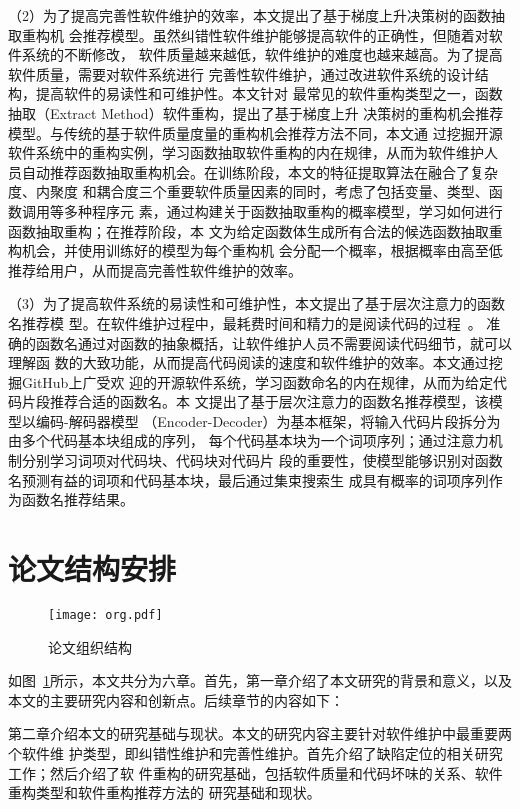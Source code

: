 （2）为了提高完善性软件维护的效率，本文提出了基于梯度上升决策树的函数抽取重构机
会推荐模型。虽然纠错性软件维护能够提高软件的正确性，但随着对软件系统的不断修改，
软件质量越来越低，软件维护的难度也越来越高。为了提高软件质量，需要对软件系统进行
完善性软件维护，通过改进软件系统的设计结构，提高软件的易读性和可维护性。本文针对
最常见的软件重构类型之一，函数抽取（Extract Method）软件重构，提出了基于梯度上升
决策树的重构机会推荐模型。与传统的基于软件质量度量的重构机会推荐方法不同，本文通
过挖掘开源软件系统中的重构实例，学习函数抽取软件重构的内在规律，从而为软件维护人
员自动推荐函数抽取重构机会。在训练阶段，本文的特征提取算法在融合了复杂度、内聚度
和耦合度三个重要软件质量因素的同时，考虑了包括变量、类型、函数调用等多种程序元
素，通过构建关于函数抽取重构的概率模型，学习如何进行函数抽取重构；在推荐阶段，本
文为给定函数体生成所有合法的候选函数抽取重构机会，并使用训练好的模型为每个重构机
会分配一个概率，根据概率由高至低推荐给用户，从而提高完善性软件维护的效率。

（3）为了提高软件系统的易读性和可维护性，本文提出了基于层次注意力的函数名推荐模
型。在软件维护过程中，最耗费时间和精力的是阅读代码的过程~\cite{rugaber2000use}。
准确的函数名通过对函数的抽象概括，让软件维护人员不需要阅读代码细节，就可以理解函
数的大致功能，从而提高代码阅读的速度和软件维护的效率。本文通过挖掘GitHub上广受欢
迎的开源软件系统，学习函数命名的内在规律，从而为给定代码片段推荐合适的函数名。本
文提出了基于层次注意力的函数名推荐模型，该模型以编码-解码器模型
（Encoder-Decoder）为基本框架，将输入代码片段拆分为由多个代码基本块组成的序列，
每个代码基本块为一个词项序列；通过注意力机制分别学习词项对代码块、代码块对代码片
段的重要性，使模型能够识别对函数名预测有益的词项和代码基本块，最后通过集束搜索生
成具有概率的词项序列作为函数名推荐结果。

\section{论文结构安排}
\begin{figure}[htp]
  \centering
  \texttt{[image: org.pdf]}
  \caption{论文组织结构}
  \label{fig:org}
\end{figure}

如图~\ref{fig:org}所示，本文共分为六章。首先，第一章介绍了本文研究的背景和意义，以及本文的主要研究内容和创新点。后续章节的内容如下：  

第二章介绍本文的研究基础与现状。本文的研究内容主要针对软件维护中最重要两个软件维
护类型，即纠错性维护和完善性维护。首先介绍了缺陷定位的相关研究工作；然后介绍了软
件重构的研究基础，包括软件质量和代码坏味的关系、软件重构类型和软件重构推荐方法的
研究基础和现状。

